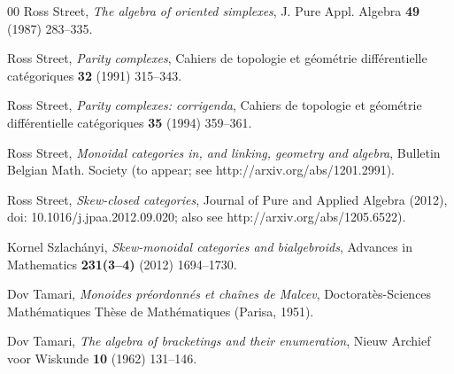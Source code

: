 \documentclass[a4paper,12pt,reqno]{amsart}
\theoremstyle{definition}
\theoremstyle{fact}
\theoremstyle{genquest}
\theoremstyle{step}
\begin{document}
\begin{thebibliography}{00}
 Ross Street, \textit{The algebra of oriented simplexes}, J. Pure Appl. Algebra \textbf{49} (1987) 283--335.\label{aos}

 Ross Street, \textit{Parity complexes}, Cahiers de topologie et g\'eom\'etrie diff\'erentielle cat\'egoriques \textbf{32} (1991) 315--343.\label{pc}

 Ross Street, \textit{Parity complexes: corrigenda}, Cahiers de topologie et g\'eom\'etrie diff\'erentielle cat\'egoriques \textbf{35} (1994) 359--361.\label{pc:c}

 Ross Street, \textit{Monoidal categories in, and linking, geometry and algebra}, Bulletin Belgian Math. Society  (to appear; see http://arxiv.org/abs/1201.2991).\label{dlVP}

 Ross Street, \textit{Skew-closed categories}, Journal of Pure and Applied Algebra (2012), doi: 10.1016/j.jpaa.2012.09.020; also see http://arxiv.org/abs/1205.6522).\label{scc}

 Kornel Szlach\'anyi, \textit{Skew-monoidal categories and bialgebroids}, Advances in Mathematics \textbf{231(3--4)} (2012) 1694--1730.
\label{Szl2012}

 Dov Tamari, \textit{Monoides pr\'eordonn\'es et cha\^ines de Malcev}, 
Doctorat\`es-Sciences Math\'ematiques Th\`ese de Math\'ematiques (Parisa, 1951).\label{Tamari51} 

 Dov Tamari, \textit{The algebra of bracketings and their enumeration}, Nieuw Archief voor Wiskunde \textbf{10} (1962) 131--146.\label{Tamari62}




\end{thebibliography}
\end{document}
